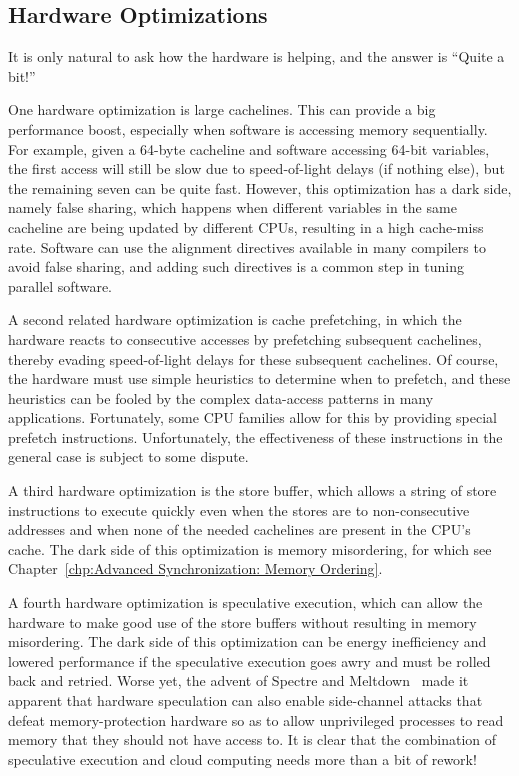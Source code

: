 \subsection{Hardware Optimizations}
\label{sec:cpu:Hardware Optimizations}

It is only natural to ask how the hardware is helping, and the answer
is ``Quite a bit!''

One hardware optimization is large cachelines.
This can provide a big performance boost, especially when software is
accessing memory sequentially.
For example, given a 64-byte cacheline and software accessing 64-bit
variables, the first access will still be slow due to speed-of-light
delays (if nothing else), but the remaining seven can be quite fast.
However, this optimization has a dark side, namely false sharing,
which happens when different variables in the same cacheline are
being updated by different CPUs, resulting in a high cache-miss rate.
Software can use the alignment directives available in many compilers
to avoid false sharing, and adding such directives is a common step
in tuning parallel software.

A second related hardware optimization is cache prefetching, in which
the hardware reacts to consecutive accesses by prefetching subsequent
cachelines, thereby evading speed-of-light delays for these
subsequent cachelines.
Of course, the hardware must use simple heuristics to determine when
to prefetch, and these heuristics can be fooled by the complex data-access
patterns in many applications.
Fortunately, some CPU families allow for this by providing special
prefetch instructions.
Unfortunately, the effectiveness of these instructions in the general
case is subject to some dispute.

A third hardware optimization is the store buffer, which allows a string
of store instructions to execute quickly even when the stores are to
non-consecutive addresses and when none of the needed cachelines are
present in the CPU's cache.
The dark side of this optimization is memory misordering, for which see
Chapter~\ref{chp:Advanced Synchronization: Memory Ordering}.

A fourth hardware optimization is speculative execution, which can
allow the hardware to make good use of the store buffers without
resulting in memory misordering.
The dark side of this optimization can be energy inefficiency and
lowered performance if the speculative execution goes awry and must
be rolled back and retried.
Worse yet, the advent of
Spectre and Meltdown~\cite{JannHorn2018MeltdownSpectre}
made it apparent that hardware speculation can also enable side-channel
attacks that defeat memory-protection hardware so as to allow unprivileged
processes to read memory that they should not have access to.
It is clear that the combination of speculative execution and cloud
computing needs more than a bit of rework!

